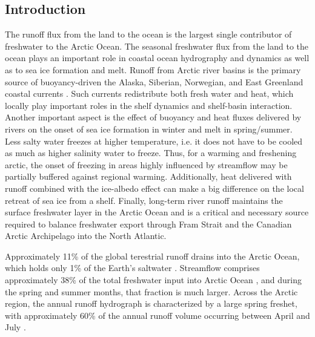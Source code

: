 \documentclass[ms, draft]{agutex}
\begin{document}
%

\begin{article}

%
%

\section{Introduction}

The runoff flux from the land to the ocean is the largest single contributor of freshwater to the Arctic Ocean.
The seasonal freshwater flux from the land to the ocean plays an important role in coastal ocean hydrography and dynamics as well as to sea ice formation and melt.
Runoff from Arctic river basins is the primary source of buoyancy-driven the Alaska, Siberian, Norwegian, and East Greenland coastal currents \citep[e.g.][]{Morison_2000,Boyd_2002,McGeehan_2012}.
Such currents redistribute both fresh water and heat, which locally play important roles in the shelf dynamics and shelf-basin interaction.
Another important aspect is the effect of buoyancy and heat fluxes delivered by rivers on the onset of sea ice formation in winter and melt in spring/summer.
Less salty water freezes at higher temperature, i.e. it does not have to be cooled as much as higher salinity water to freeze.
Thus, for a warming and freshening arctic, the onset of freezing in areas highly influenced by streamflow may be partially buffered against regional warming.
Additionally, heat delivered with runoff combined with the ice-albedo effect can make a big difference on the local retreat of sea ice from a shelf.
Finally, long-term river runoff maintains the surface freshwater layer in the Arctic Ocean and is a critical and necessary source required to balance freshwater export through Fram Strait and the Canadian Arctic Archipelago into the North Atlantic.

Approximately 11\% of the global terestrial runoff drains into the Arctic Ocean, which holds only 1\% of the Earth's saltwater \citep{Lewis_2000,Lammers_2001}.
Streamflow comprises approximately 38\% of the total freshwater input into Arctic Ocean \citep{Serreze_2006}, and during the spring and summer months, that fraction is much larger.
Across the Arctic region, the annual runoff hydrograph is characterized by a large spring freshet, with approximately 60\% of the annual runoff volume occurring between April and July \citep{Lammers_2001}.


\end{article}
\end{document}
